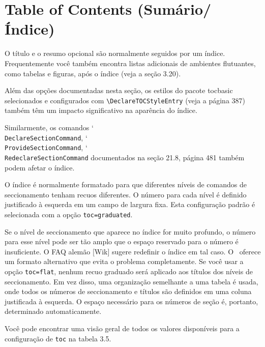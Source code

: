 \chapter[Table of Contents]{Table of Contents (Sumário/Índice)}

O título e o resumo opcional são normalmente seguidos por um índice. Frequentemente você também encontra listas adicionais de ambientes flutuantes, como tabelas e figuras, após o índice (veja a seção 3.20).

Além das opções documentadas nesta seção, os estilos do pacote tocbasic selecionados e configurados com
\verb|\DeclareTOCStyleEntry| (veja a página 387) também têm um impacto significativo na aparência do índice.

Similarmente, os comandos \char`\\\texttt{De\-cla\-re\-Sec\-tion\-Com\-mand}, \char`\\\texttt{Pro\-vi\-de\-Sec\-ti\-on\-Com\-mand}, \char`\\\texttt{Re\-de\-cla\-reSec\-ti\-onCom\-mand} documentados na seção 21.8, página 481 também podem afetar o índice.

O índice é normalmente formatado para que diferentes níveis de comandos de seccionamento tenham recuos diferentes. O número para cada nível é definido justificado à esquerda em um campo de largura fixa. Esta configuração padrão é selecionada com a opção \verb|toc=graduated|.

Se o nível de seccionamento que aparece no índice for muito profundo, o número para esse nível pode ser tão amplo que o espaço reservado para o número é insuficiente. O FAQ alemão [Wik] sugere redefinir o índice em tal caso. O \KOMAScript\ oferece um formato alternativo que evita o problema completamente. Se você usar a opção \verb|toc=flat|, nenhum recuo graduado será aplicado aos títulos dos níveis de seccionamento. Em vez disso, uma organização semelhante a uma tabela é usada, onde todos os números de seccionamento e títulos são definidos em uma coluna justificada à esquerda. O espaço necessário para os números de seção é, portanto, determinado automaticamente.

Você pode encontrar uma visão geral de todos os valores disponíveis para a configuração de \verb|toc| na tabela 3.5.

